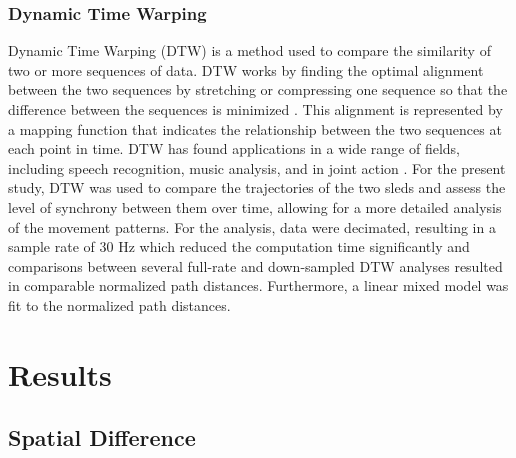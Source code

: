 \documentclass[10pt,a4paper,onecolumn]{article}
\begin{document}
\hypertarget{dynamic-time-warping}{%
\subsubsection{Dynamic Time Warping}\label{dynamic-time-warping}}

Dynamic Time Warping (DTW) is a method used to compare the similarity of two or more sequences of data. DTW works by finding the optimal alignment between the two sequences by stretching or compressing one sequence so that the difference between the sequences is minimized \autocite{mullerDynamicTimeWarping2007}. This alignment is represented by a mapping function that indicates the relationship between the two sequences at each point in time. DTW has found applications in a wide range of fields, including speech recognition, music analysis, and in joint action \autocite{hochDancingTogetherInfant2021}. For the present study, DTW was used to compare the trajectories of the two sleds and assess the level of synchrony between them over time, allowing for a more detailed analysis of the movement patterns. For the analysis, data were decimated, resulting in a sample rate of 30 Hz which reduced the computation time significantly and comparisons between several full-rate and down-sampled DTW analyses resulted in comparable normalized path distances. Furthermore, a linear mixed model was fit to the normalized path distances.

\hypertarget{results}{%
\section{Results}\label{results}}

\hypertarget{spatial-difference}{%
\subsection{Spatial Difference}\label{spatial-difference}}
\end{document}
